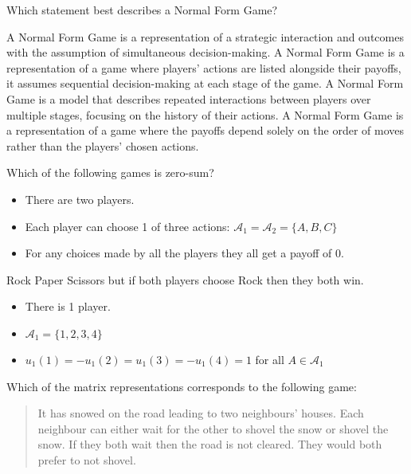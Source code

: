 \documentclass{exam}
\begin{document}
\begin{questions}
        
\question 
    Which statement best describes a Normal Form Game?
\begin{checkboxes}
   \choice 
A Normal Form Game is a representation of a strategic interaction and outcomes with the
    assumption of simultaneous decision-making.
   \choice 
A Normal Form Game is a representation of a game where players' actions are listed alongside their payoffs, it assumes sequential decision-making at each stage of the game.
   \choice 
A Normal Form Game is a model that describes repeated interactions between players over multiple stages, focusing on the history of their actions.
    \choice
A Normal Form Game is a representation of a game where the payoffs depend solely
    on the order of moves rather than the players' chosen actions.
\end{checkboxes}



\question Which of the following games is zero-sum?
\begin{checkboxes}
   \choice 
        \begin{itemize}
            \item There are two players.
            \item Each player can choose 1 of three actions:
                $\mathcal{A}_1=\mathcal{A}_2=\{A, B, C\}$
            \item For any choices made by all the players they all get a payoff
                of 0.
        \end{itemize}
   \choice 
        Rock Paper Scissors but if both players choose Rock then they both win.
   \choice 
        \begin{itemize} 
            \item There is 1 player.
            \item \(\mathcal{A}_1=\{1, 2, 3, 4\}\)
            \item \(u_1(1)=-u_1(2)=u_1(3)=-u_1(4)=1\) for all \(A \in \mathcal{A}_1\)
        \end{itemize}
\end{checkboxes}

\question Which of the matrix representations corresponds to the following game:

    \begin{quote}
        It has snowed on the road leading to two neighbours' houses. Each
        neighbour can either wait for the other to shovel the snow or shovel the
        snow. If they both wait then the road is not cleared. They would both
        prefer to not shovel.
    \end{quote}


\end{questions}
\end{document}
